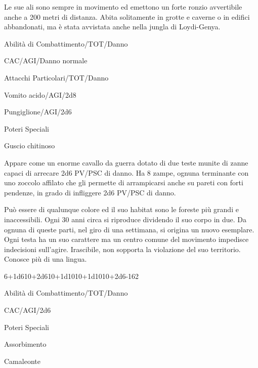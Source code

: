 Le sue ali sono sempre in movimento ed
emettono un forte ronzio avvertibile anche a 200 metri di distanza.
Abita solitamente in grotte e caverne o in edifici abbandonati, ma
\`e stata avvistata anche nella jungla di Loydi-Genya.


\begin{parmostro}{Abilit\`a di Combattimento/TOT/Danno}
\item CAC/AGI/Danno normale
\end{parmostro}

\begin{parmostro}{Attacchi Particolari/TOT/Danno}
\item Vomito acido/AGI/2d8
\item Pungiglione/AGI/2d6
\end{parmostro}

\begin{parmostro}{Poteri Speciali}
\item Guscio chitinoso
\end{parmostro}

Appare come un enorme cavallo da guerra dotato di due teste munite di
zanne capaci di arrecare 2d6 PV/PSC di danno. Ha 8 zampe, ognuna
terminante con uno zoccolo affilato che gli permette di arrampicarsi
anche su pareti con forti pendenze, in grado di infliggere 2d6 PV/PSC
di danno.

Pu\`o essere di qualunque colore ed il suo habitat sono le foreste
pi\`u grandi e inaccessibili. Ogni 30 anni circa si riproduce
dividendo il suo corpo in due. Da ognuna di queste parti, nel giro di
una settimana, si origina un nuovo esemplare. Ogni testa ha un suo
carattere ma un centro comune del movimento impedisce indecisioni
sull'agire.  Irascibile, non sopporta la violazione del suo
territorio. Conosce pi\`u di una lingua.

{6+1d6}{10+2d6}{10+1d10}{10+1d10}{10+2d6}{-}{162}

\begin{parmostro}{Abilit\`a di Combattimento/TOT/Danno}
\item CAC/AGI/2d6
\end{parmostro}

\begin{parmostro}{Poteri Speciali}
\item Assorbimento
\item Camaleonte
\end{parmostro}

